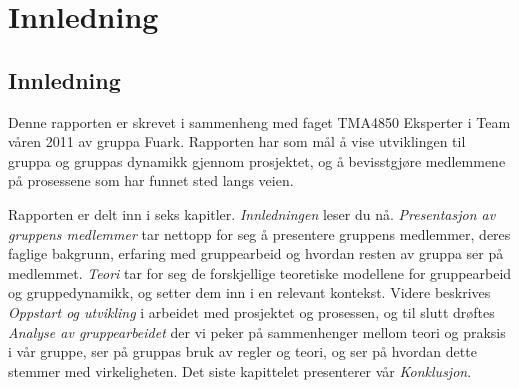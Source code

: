 \chapter{Innledning}
\section*{Innledning}
Denne rapporten er skrevet i sammenheng med faget TMA4850 Eksperter i Team våren
2011 av gruppa Fu\th ark. Rapporten har som mål å vise utviklingen til gruppa
og gruppas dynamikk gjennom prosjektet, og å bevisstgjøre medlemmene på
prosessene som har funnet sted langs veien.

Rapporten er delt inn i seks kapitler. \emph{Innledningen} leser du nå.
\emph{Presentasjon av gruppens medlemmer} tar nettopp for seg å presentere
gruppens medlemmer, deres faglige bakgrunn, erfaring med gruppearbeid og hvordan
resten av gruppa ser på medlemmet. \emph{Teori} tar for seg de forskjellige
teoretiske modellene for gruppearbeid og gruppedynamikk, og setter dem inn i en
relevant kontekst. Videre beskrives \emph{Oppstart og utvikling} i arbeidet med
prosjektet og prosessen, og til slutt drøftes \emph{Analyse av gruppearbeidet}
der vi peker på sammenhenger mellom teori og praksis i vår gruppe, ser på
gruppas bruk av regler og teori, og ser på hvordan dette stemmer med
virkeligheten. Det siste kapittelet presenterer vår \emph{Konklusjon}.
